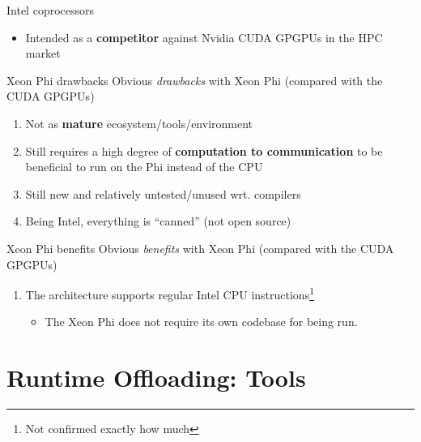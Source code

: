 \documentclass[screen]{beamer}
\begin{document}
\begin{frame}{Intel coprocessors}
    \pause
    \begin{itemize}
        \item Intended as a \textbf{competitor} against Nvidia CUDA GPGPUs in the HPC market
    \end{itemize}
\end{frame}

\begin{frame}{Xeon Phi drawbacks}
    Obvious \textit{drawbacks} with Xeon Phi (compared with the CUDA GPGPUs)
    \begin{enumerate}[<+-| alert@+>]
        \item Not as \textbf{mature} ecosystem/tools/environment
        \item Still requires a high degree of \textbf{computation to communication} to be beneficial to run on the Phi instead of the CPU
        \item Still new and relatively untested/unused wrt. compilers
        \item Being Intel, everything is ``canned'' (not open source)
    \end{enumerate}
\end{frame}

\begin{frame}{Xeon Phi benefits}
    Obvious \textit{benefits} with Xeon Phi (compared with the CUDA GPGPUs)
    \begin{enumerate}[<+-| alert@+>]
        \item The architecture supports regular Intel CPU instructions\footnote{Not confirmed exactly how much}
        \begin{itemize}[<+-| alert@+>]
            \item The Xeon Phi does not require its own codebase for being run.
        \end{itemize}
    \end{enumerate}
\end{frame}

\section{Runtime Offloading: Tools}
\end{document}
